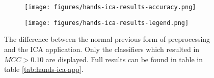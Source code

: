 \begin{figure}[h]
    \centering
    \begin{subfigure}{0.5\linewidth}
        \centering
        \captionsetup{width = 0.9\linewidth}
        \texttt{[image: figures/hands-ica-results-accuracy.png]}
    \end{subfigure}%
    \begin{subfigure}{0.5\linewidth}
        \centering
        \captionsetup{width = 0.9\linewidth}
        \texttt{[image: figures/hands-ica-results-legend.png]}
    \end{subfigure}%
    \caption{The difference between the normal previous form of preprocessing and the ICA application. Only the classifiers which resulted in $MCC > 0.10$ are displayed. Full results can be found in table in table \ref{tab:hands-ica-app}.}
    \label{fig:hands-ica-results}
\end{figure}